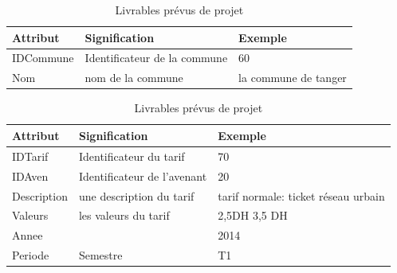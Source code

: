 \documentclass[a4paper]{report}
\begin{document}
\begin{doublespace}
	\begin{table}[H]
		\begin{center}
			\begin{tabularx}{17.5cm}{|X|X|X|}
				\hline
				\textbf{Attribut} & \textbf{Signification}       &
				\textbf{Exemple}                                                        \\
				\hline
				IDCommune         & Identificateur de la commune & 60                   \\
				\hline
				Nom               & nom de la commune            & la commune de tanger \\
				\hline
			\end{tabularx}
			\caption{Livrables prévus de projet}
		\end{center}
	\end{table}
	
	\begin{table}[H]
		\begin{center}
			\begin{tabularx}{17.5cm}{|X|X|X|}
				\hline
				\textbf{Attribut} & \textbf{Signification}      &
				\textbf{Exemple}                                                        \\
				\hline
				IDTarif           & Identificateur du tarif     & 70                    \\
				\hline
				IDAven            & Identificateur de l'avenant & 20                    \\
				\hline
				Description       & une description du tarif    & tarif normale: ticket
				réseau urbain                                                           \\
				\hline
				Valeurs           & les valeurs du tarif        & 2,5DH 3,5 DH          \\
				\hline
				Annee             &                             & 2014                  \\
				\hline
				Periode           & Semestre                    & T1                    \\
				\hline
			\end{tabularx}
			\caption{Livrables prévus de projet}
		\end{center}
	\end{table}
	

\end{doublespace}
\end{document}
